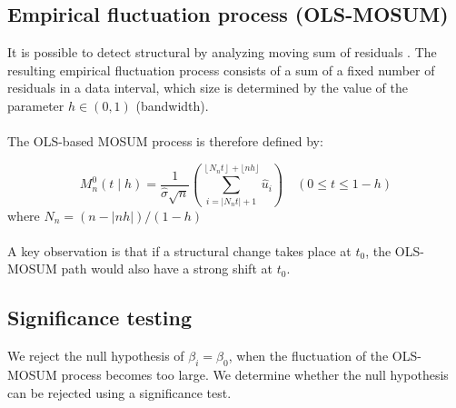 \documentclass[main.tex]{subfiles}
\begin{document}
\subsection{Empirical fluctuation process (OLS-MOSUM)}
\label{subsec:empirical_fluctuation}
It is possible to detect structural by analyzing moving sum of residuals
\cite{strucchange}. The resulting empirical fluctuation process consists of a
sum of a fixed number of residuals in a data interval, which size is determined
by the value of the parameter $h \in (0,1)$ (bandwidth).\\\\
The OLS-based MOSUM process is therefore defined by:

\begin{equation} \label{eq:mosum}
M_{n}^{0}(t \mid h)=\frac{1}{\hat{\sigma} \sqrt{n}}
\left(\sum_{i=\left|N_{n} t\right|+1}^{\left\lfloor N_{n} t\right\rfloor+\lfloor
  n h\rfloor} \hat{u}_{i}\right) \quad(0 \leq t \leq 1-h)
\end{equation}
where $N_{n}=(n-|n h|) /(1-h)$\\\\
A key observation is that if a structural change takes place at $t_0$, the
OLS-MOSUM path would also have a strong shift at $t_0$.

\subsection{Significance testing}
\label{subsec:significance_testing}
We reject the null hypothesis of $\beta_i = \beta_0$, when the fluctuation of
the OLS-MOSUM process becomes too large. We determine whether the null
hypothesis can be rejected using a significance test.
\end{document}
